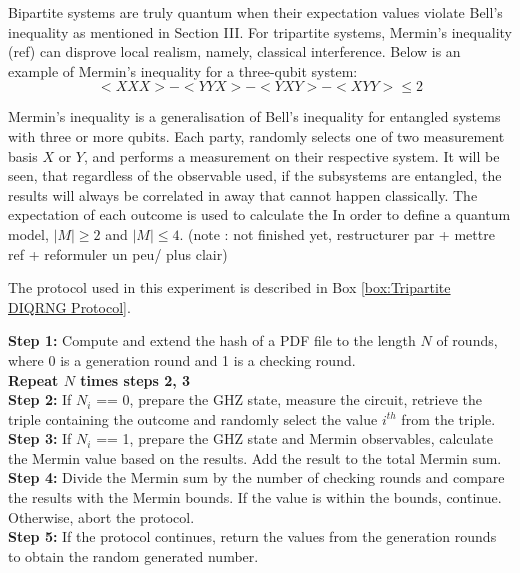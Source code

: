 \documentclass[lettersize,journal]{IEEEtran}
\begin{document}
Bipartite systems are truly quantum when their expectation values violate Bell's inequality as mentioned in Section III. For tripartite systems, Mermin's inequality (ref) can disprove local realism, namely, classical interference. Below is an example of Mermin's inequality for a three-qubit system:
\begin{equation}
    <XXX>-<YYX>-<YXY>-<XYY>\leq 2 
    \label{eq:mermin}
\end{equation}

Mermin's inequality is a generalisation of Bell's inequality for entangled systems with three or more qubits. Each party, randomly selects one of two measurement basis $X$ or $Y$, and performs a measurement on their respective system. It will be seen, that regardless of the observable used, if the subsystems are entangled, the results will always be correlated in away that cannot happen classically. The expectation of each outcome is used to calculate the   In order to define a quantum model, $|M|\geq 2$ and $|M|\leq 4$. (note : not finished yet, restructurer par + mettre ref + reformuler un peu/ plus clair)

The protocol used in this experiment is described in Box \ref{box:Tripartite DIQRNG Protocol}.

\begin{tcolorbox}[width=8cm, height=9cm, colback=gray!10, colframe=gray!70, title= Tripartite DIQRNG Protocol]
    \textbf{Step 1:} Compute and extend the hash of a PDF file to the length $N$ of rounds, where 0 is a generation round and 1 is a checking round.  \\
    \textbf{Repeat $N$ times steps 2, 3}\\
    \textbf{Step 2:} If $N_i$ == 0, prepare the GHZ state, measure the circuit, retrieve the triple containing the outcome and randomly select the value $i^{th}$ from the triple.\\
    \textbf{Step 3:} If $N_i$ == 1, prepare the GHZ state and Mermin observables, calculate the Mermin value based on the results. Add the result to the total Mermin sum.\\
    \textbf{Step 4:} Divide the Mermin sum by the number of checking rounds and compare the results with the Mermin bounds. If the value is within the bounds, continue. Otherwise, abort the protocol.\\
    \textbf{Step 5:} If the protocol continues, return the values from the generation rounds to obtain the random generated number.
    \label{box:Tripartite DIQRNG Protocol}
\end{tcolorbox}
 
\end{document}
